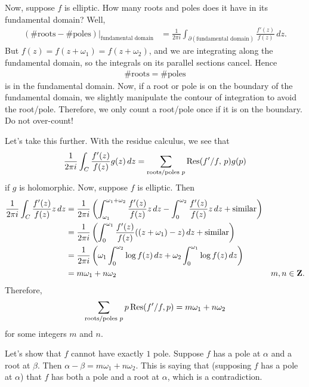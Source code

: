 \documentclass[11pt, oneside,margin=1in]{article}
\begin{document}
Now, suppose $f$ is elliptic. How many roots and poles does it have in its fundamental domain? Well,
\begin{align*}
	(\#\textrm{roots} - \#\textrm{poles})\Big |_{\textrm{fundamental domain}}& = \frac{1}{2\pi i} \int_{\partial(\textrm{fundamental domain})} \frac{f' (z)}{f (z)}\, dz.
\end{align*}
But $f(z)=f (z+\omega_1) = f(z+\omega_2)$, and we are integrating along the fundamental domain, so the integrals on its parallel sections cancel. Hence
\begin{align*}
	\#\textrm{roots} = \#\textrm{poles}
\end{align*}
is in the fundamental domain. Now, if a root or pole is on the boundary of the fundamental domain, we slightly manipulate the contour of integration to avoid the root/pole. Therefore, we only count a root/pole once if it is on the boundary. Do not over-count! 

Let's take this further. With the residue calculus, we see that
\begin{align*}
	\frac{1}{2\pi i} \int_C \frac{f'(z)}{f (z)} g (z)\, dz = \sum_{\textrm{roots/poles $p$}} \operatorname{Res} (f'/f, \,p) g (p)
\end{align*}
if $g$ is holomorphic. Now, suppose $f$ is elliptic. Then
\begin{align*}
	\frac{1}{2\pi i} \int_C \frac{f'(z) }{f(z) } z\, dz &= \frac{1}{2\pi i} \left( \int_{\omega_1}^{\omega_1+\omega_2} \frac{f'(z) }{f(z) } z\, dz - \int_0^{\omega_2}\frac{f'(z) }{f(z) } z\, dz +\textrm{similar} \right)\\
							    &= \frac{1}{2\pi i} \left( \int_0^{\omega_1} \frac{f'(z) }{f(z) } ((z+\omega_1) - z) \, dz + \textrm{similar} \right)\\
							    &= \frac{1}{2\pi i} \left( \omega_1 \int_0^{\omega_2} \log f(z)\, dz + \omega_2 \int_0^{\omega_1} \log f(z) \, dz\right)\\
							    &= m\omega_1 + n\omega_2 &m,n\in \mathbf Z.
\end{align*}
Therefore, 
\begin{align*}
	\sum_{\textrm{roots/poles $p$}} p \operatorname{Res}(f'/f, p) = m\omega_1+n\omega_2
\end{align*}
for some integers $m$ and $n$.

Let's show that $f$ cannot have exactly $1$ pole. Suppose $f$ has a pole at $\alpha$ and a root at $\beta$. Then $\alpha-\beta = m\omega_1+n\omega_2$. This is saying that (supposing $f$ has a pole at $\alpha$) that $f$ has both a pole and a root at $\alpha$, which is a contradiction.
\end{document}
